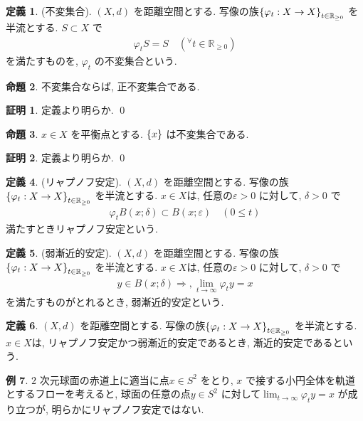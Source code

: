 \documentclass[10pt, fleqn, label-section=none]{bxjsarticle}
\theoremstyle{definition}
\newtheorem{dfn}{定義}[section]
\newtheorem{ex}[dfn]{例}
\newtheorem{prop}[dfn]{命題}
\newtheorem*{pf*}{証明}
\newcommand{\any}{{}^{\forall}}
\newcommand{\veps}{\varepsilon}
\newcommand{\cbra}[1]{\mleft\{#1\mright\}}
\newcommand{\naraba}{\Rightarrow}
\renewcommand{\;}{\, ; \,}
\begin{document}
\begin{dfn}(不変集合). $(X, d)$ を距離空間とする. 写像の族$\cbra{\varphi_t : X \rightarrow X}_{t \in \mathbb R_{\geq 0 } }$ を半流とする. $S \subset  X$ で
\begin{align*} \varphi_t S =  S \quad (\any t \in \mathbb R_{\geq 0}) \end{align*}
を満たすものを, $\varphi_t$ の不変集合という. 

\end{dfn}

\begin{prop} 不変集合ならば, 正不変集合である. 

\end{prop}
\begin{pf*}
定義より明らか. 
\qed
\end{pf*}

\begin{prop}$x \in X$ を平衡点とする. $\cbra{x}$ は不変集合である. 

\end{prop}
\begin{pf*}
定義より明らか. 
\qed
\end{pf*}


\begin{dfn}(リャプノフ安定). $(X, d)$ を距離空間とする. 写像の族$\cbra{\varphi_t : X \rightarrow X}_{t \in \mathbb R_{\geq 0 } }$ を半流とする. $x \in X$は, 任意の$\veps > 0$ に対して, $\delta > 0$ で
\begin{align*} \varphi_t B(x; \delta) \subset B(x; \veps) \quad (0 \leq t) \end{align*}
満たすときリャプノフ安定という. 
\end{dfn}

\begin{dfn}(弱漸近的安定). $(X, d)$ を距離空間とする. 写像の族$\cbra{\varphi_t : X \rightarrow X}_{t \in \mathbb R_{\geq 0 } }$ を半流とする. $x \in X$は, 任意の$\veps > 0$ に対して, $\delta > 0$ で
\begin{align*} y \in B(x; \delta) \naraba, \lim_{t \rightarrow \infty} \varphi_t y = x \end{align*}
を満たすものがとれるとき, 弱漸近的安定という. 
\end{dfn}

\begin{dfn}$(X, d)$ を距離空間とする. 写像の族$\cbra{\varphi_t : X \rightarrow X}_{t \in \mathbb R_{\geq 0 } }$ を半流とする. $x \in X$は, リャプノフ安定かつ弱漸近的安定であるとき, 漸近的安定であるという. 

\end{dfn}

\begin{ex}$2$ 次元球面の赤道上に適当に点$x \in S^2$ をとり, $x$ で接する小円全体を軌道とするフローを考えると, 球面の任意の点$y \in S^2$ に対して$\lim_{t \rightarrow \infty} \varphi_t y = x$ が成り立つが, 明らかにリャプノフ安定ではない. 

\end{ex}
\end{document}

